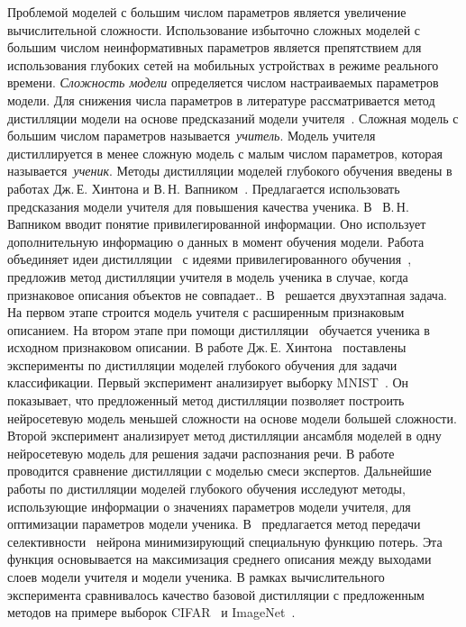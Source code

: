 Проблемой моделей с большим числом параметров является увеличение вычислительной сложности.
Использование избыточно сложных моделей с большим числом неинформативных параметров является препятствием для использования глубоких сетей на мобильных устройствах в режиме реального времени. \textit{Сложность модели} определяется числом настраиваемых параметров модели.
Для снижения числа параметров в литературе рассматривается метод дистилляции модели на основе предсказаний модели учителя~\cite{Hinton2015, Vapnik2015, Lopez2016}.
Сложная модель с большим числом параметров называется~\textit{учитель}. Модель учителя дистиллируется в менее сложную модель с малым числом параметров, которая называется~\textit{ученик}.
Методы дистилляции моделей глубокого обучения введены в работах Дж.\,Е. Хинтона и В.\,Н. Вапником~\cite{Hinton2015, Vapnik2015, Lopez2016}.
Предлагается использовать предсказания модели учителя для повышения качества ученика.
В~\cite{Vapnik2015} В.\,Н. Вапником вводит понятие привилегированной информации. Оно использует дополнительную информацию о данных в момент обучения модели.
Работа~\cite{Lopez2016} объединяет идеи дистилляции~\cite{Hinton2015} с идеями привилегированного обучения~\cite{Vapnik2015}, предложив метод дистилляции учителя в модель ученика в случае, когда признаковое описания объектов не совпадает..
В~\cite{Lopez2016} решается двухэтапная задача. На первом этапе строится модель учителя с расширенным признаковым описанием.
На втором этапе при помощи дистилляции~\cite{Hinton2015} обучается ученика в исходном признаковом описании.
В работе Дж.\,Е. Хинтона~\cite{Hinton2015} поставлены эксперименты по дистилляции моделей глубокого обучения для задачи классификации.
Первый эксперимент анализирует выборку MNIST~\cite{mnist}. Он показывает, что предложенный метод дистилляции позволяет построить нейросетевую модель меньшей сложности на основе модели большей сложности.
Второй эксперимент анализирует метод дистилляции ансамбля моделей в одну нейросетевую модель для решения задачи распознания речи. В работе~\cite{Hinton2015} проводится сравнение дистилляции с моделью смеси экспертов.
Дальнейшие работы по дистилляции моделей глубокого обучения исследуют методы, использующие информации о значениях параметров модели учителя, для оптимизации параметров модели ученика. В~\cite{Zehao2017} предлагается метод передачи селективности~\cite{Tatarchuk2014} нейрона минимизирующий специальную функцию потерь. Эта функция основывается на максимизация среднего описания между выходами слоев модели учителя и модели ученика. В рамках вычислительного эксперимента сравнивалось качество базовой дистилляции с предложенным методов на примере выборок CIFAR~\cite{cifar10} и ImageNet~\cite{imagenet}.

